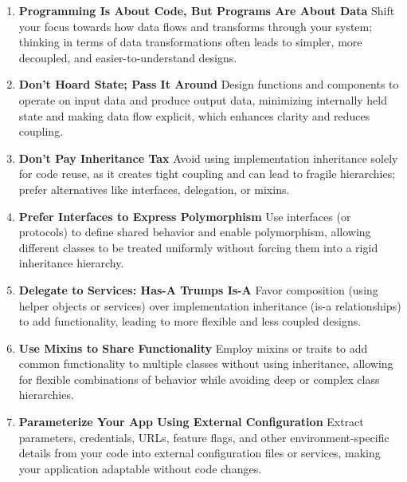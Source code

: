 \documentclass[11pt]{article}
\begin{document}
\begin{enumerate}[label=\arabic*., start=41, itemsep=1ex]
    \item \textbf{Programming Is About Code, But Programs Are About Data}
    Shift your focus towards how data flows and transforms through your system; thinking in terms of data transformations often leads to simpler, more decoupled, and easier-to-understand designs.

    \item \textbf{Don’t Hoard State; Pass It Around}
    Design functions and components to operate on input data and produce output data, minimizing internally held state and making data flow explicit, which enhances clarity and reduces coupling.

    \item \textbf{Don’t Pay Inheritance Tax}
    Avoid using implementation inheritance solely for code reuse, as it creates tight coupling and can lead to fragile hierarchies; prefer alternatives like interfaces, delegation, or mixins.

    \item \textbf{Prefer Interfaces to Express Polymorphism}
    Use interfaces (or protocols) to define shared behavior and enable polymorphism, allowing different classes to be treated uniformly without forcing them into a rigid inheritance hierarchy.

    \item \textbf{Delegate to Services: Has-A Trumps Is-A}
    Favor composition (using helper objects or services) over implementation inheritance (is-a relationships) to add functionality, leading to more flexible and less coupled designs.

    \item \textbf{Use Mixins to Share Functionality}
    Employ mixins or traits to add common functionality to multiple classes without using inheritance, allowing for flexible combinations of behavior while avoiding deep or complex class hierarchies.

    \item \textbf{Parameterize Your App Using External Configuration}
    Extract parameters, credentials, URLs, feature flags, and other environment-specific details from your code into external configuration files or services, making your application adaptable without code changes.
\end{enumerate}

\newpage
\end{document}
